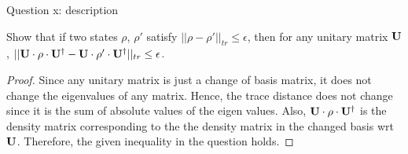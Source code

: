 \begin{solution}{Question x: description}\label{ques:x}
    \begin{question}
        Show that if two states $\rho$, $\rho'$ satisfy $||\rho - \rho'||_{tr} \leq \epsilon$, then for any unitary matrix $\mathbf{U}$, $||\mathbf{U}\cdot\rho\cdot\mathbf{U}^\dagger - \mathbf{U}\cdot\rho'\cdot\mathbf{U}^\dagger||_{tr} \leq \epsilon$.
    \end{question}
    \tcblower{}
    \begin{proof}
        Since any unitary matrix is just a change of basis matrix, it does not change the eigenvalues of any matrix. Hence, the trace distance does not change since it is the sum of absolute values of the eigen values. Also, $\mathbf{U}\cdot\rho\cdot\mathbf{U}^\dagger$ is the density matrix corresponding to the the density matrix in the changed basis wrt $\mathbf{U}$. Therefore, the given inequality in the question holds.
    \end{proof}
\end{solution}
